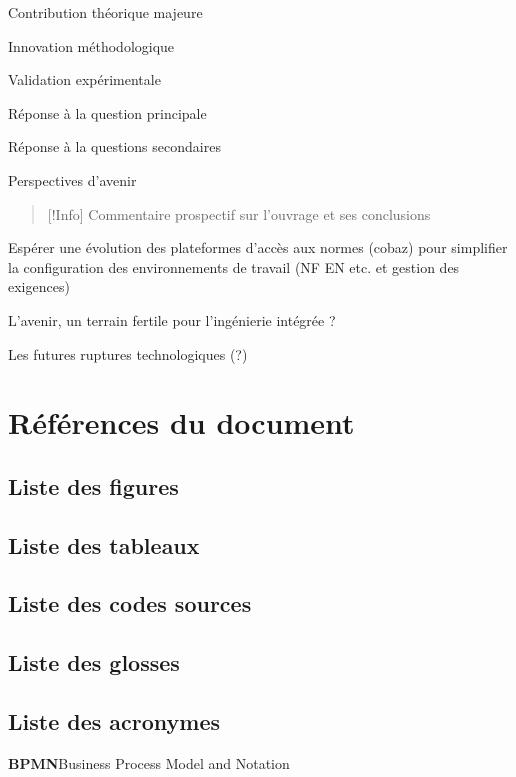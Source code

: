 \documentclass[a4paper,12pt]{article}
\begin{document}
Contribution théorique majeure

Innovation méthodologique

Validation expérimentale

Réponse à la question principale

Réponse à la questions secondaires

Perspectives d'avenir


\begin{quote}
{[}!Info] Commentaire prospectif sur l'ouvrage et ses conclusions
\end{quote}

Espérer une évolution des plateformes d'accès aux normes (cobaz) pour simplifier la configuration des environnements de travail (NF EN etc. et gestion des exigences)

L'avenir, un terrain fertile pour l'ingénierie intégrée ?

Les futures ruptures technologiques (?)
\clearpage
\section{Références du document}
\label{sec:org4357a8d}
\subsection{Liste des figures}
\label{sec:org331ac87}
\renewcommand{\listfigurename}{\vspace{-2em}}
\listoffigures
\subsection{Liste des tableaux}
\label{sec:org1a992fa}
\renewcommand{\listtablename}{\vspace{-2em}}
\listoftables
\subsection{Liste des codes sources}
\label{sec:orgb06c116}
\renewcommand{\lstlistingname}{\vspace{-2em}}
\lstlistoflistings
\subsection{Liste des glosses}
\label{sec:org8c50920}


\subsection{Liste des acronymes}
\label{sec:org67d89e2}
\textbf{\hypertarget{gls-78}{BPMN}}\hspace*{1em}Business Process Model and Notation\hspace*{.5em}\pageref{gls-4-use-1}
\end{document}
